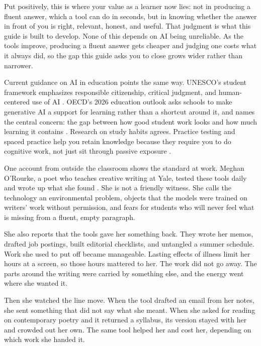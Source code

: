 \documentclass{SIAMbook2023}
\begin{document}
Put positively, this is where your value as a learner now lies: not in producing a fluent answer, which a tool can do in seconds, but in knowing whether the answer in front of you is right, relevant, honest, and useful. That judgment is what this guide is built to develop. None of this depends on AI being unreliable. As the tools improve, producing a fluent answer gets cheaper and judging one costs what it always did, so the gap this guide asks you to close grows wider rather than narrower.

Current guidance on AI in education points the same way. UNESCO's student framework emphasizes responsible citizenship, critical judgment, and human-centered use of AI \citep{miao2024aia}. OECD's 2026 education outlook asks schools to make generative AI a support for learning rather than a shortcut around it, and names the central concern: the gap between how good student work looks and how much learning it contains \citep{oecd2026digital}. Research on study habits agrees. Practice testing and spaced practice help you retain knowledge because they require you to do cognitive work, not just sit through passive exposure \citep{dunlosky2013improving}.

One account from outside the classroom shows the standard at work. Meghan O'Rourke, a poet who teaches creative writing at Yale, tested these tools daily and wrote up what she found \citep{orourke2025teach}. She is not a friendly witness. She calls the technology an environmental problem, objects that the models were trained on writers' work without permission, and fears for students who will never feel what is missing from a fluent, empty paragraph.

She also reports that the tools gave her something back. They wrote her memos, drafted job postings, built editorial checklists, and untangled a summer schedule. Work she used to put off became manageable. Lasting effects of illness limit her hours at a screen, so those hours mattered to her. The work did not go away. The parts around the writing were carried by something else, and the energy went where she wanted it.

Then she watched the line move. When the tool drafted an email from her notes, she sent something that did not say what she meant. When she asked for reading on contemporary poetry and it returned a syllabus, its version stayed with her and crowded out her own. The same tool helped her and cost her, depending on which work she handed it.
\end{document}
